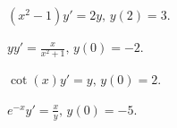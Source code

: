 \documentclass[12pt]{book}
\begin{document}

\begin{exercise}
$(x^2-1)y' = 2y,\, y(2)= 3.$
\end{exercise}


\begin{exercise}
$y y'= \frac{x}{x^2 +1},\, y(0)= -2. $
\end{exercise}


\begin{exercise}
$\cot(x) y' = y,\, y(0)= 2.$
\end{exercise}


\begin{exercise}
$e^{-x} y'=\frac{x}{y},\, y(0)= -5.$
\end{exercise}

\end{document}
